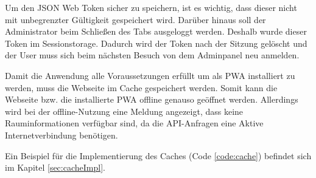 
Um den JSON Web Token sicher zu speichern, ist es wichtig, dass dieser nicht mit unbegrenzter Gültigkeit gespeichert wird. Darüber hinaus soll der Administrator beim Schließen des Tabs ausgeloggt werden. Deshalb wurde dieser Token im Sessionstorage. Dadurch wird der Token nach der Sitzung gelöscht und der User muss sich beim nächsten Besuch von dem Adminpanel neu anmelden.


Damit die Anwendung alle Voraussetzungen erfüllt um als PWA installiert zu werden, muss die Webseite im Cache gespeichert werden. Somit kann die Webseite bzw. die installierte PWA offline genauso geöffnet werden. Allerdings wird bei der offline-Nutzung eine Meldung angezeigt, dass keine Rauminformationen verfügbar sind, da die API-Anfragen eine Aktive Internetverbindung benötigen.

Ein Beispiel für die Implementierung des Caches (Code \ref{code:cache}) befindet sich im Kapitel \ref{sec:cacheImpl}.
 